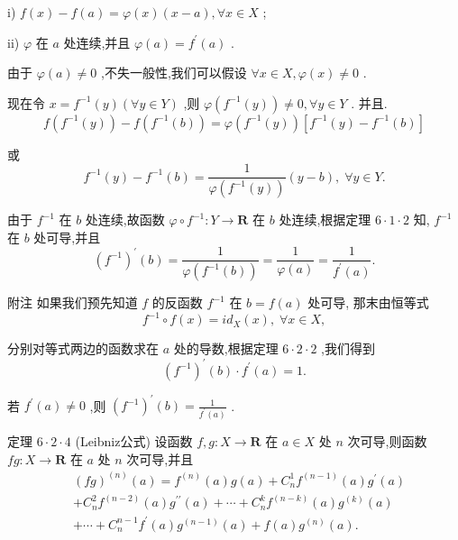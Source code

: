 i) $f\left( x\right)  - f\left( a\right)  = \varphi \left( x\right) \left( {x - a}\right) ,\forall x \in  X$ ;

ii) $\varphi$ 在 $a$ 处连续,并且 $\varphi \left( a\right)  = {f}^{\prime }\left( a\right)$ .

由于 $\varphi \left( a\right)  \neq  0$ ,不失一般性,我们可以假设 $\forall x \in  X,\varphi \left( x\right)  \neq  0$ .

现在令 $x = {f}^{-1}\left( y\right) \left( {\forall y \in  Y}\right)$ ,则 $\varphi \left( {{f}^{-1}\left( y\right) }\right)  \neq  0,\forall y \in  Y$ . 并且.
$$f\left( {{f}^{-1}\left( y\right) }\right)  - f\left( {{f}^{-1}\left( b\right) }\right)  = \varphi \left( {{f}^{-1}\left( y\right) }\right) \left\lbrack  {{f}^{-1}\left( y\right)  - {f}^{-1}\left( b\right) }\right\rbrack$$

或
$${f}^{-1}\left( y\right)  - {f}^{-1}\left( b\right)  = \frac{1}{\varphi \left( {{f}^{-1}\left( y\right) }\right) }\left( {y - b}\right) ,\;\forall y \in  Y.$$

由于 ${f}^{-1}$ 在 $b$ 处连续,故函数 $\varphi  \circ  {f}^{-1} : Y \rightarrow  \mathbf{R}$ 在 $b$ 处连续,根据定理 $6 \cdot  1 \cdot  2$ 知, ${f}^{-1}$ 在 $b$ 处可导,并且
$${\left( {f}^{-1}\right) }^{\prime }\left( b\right)  = \frac{1}{\varphi \left( {{f}^{-1}\left( b\right) }\right) } = \frac{1}{\varphi \left( a\right) } = \frac{1}{{f}^{\prime }\left( a\right) }.$$

附注 如果我们预先知道 $f$ 的反函数 ${f}^{-1}$ 在 $b = f\left( a\right)$ 处可导, 那末由恒等式
$${f}^{-1} \circ  f\left( x\right)  = i{d}_{X}\left( x\right) ,\;\forall x \in  X,$$

分别对等式两边的函数求在 $a$ 处的导数,根据定理 $6 \cdot  2 \cdot  2$ ,我们得到
$${\left( {f}^{-1}\right) }^{\prime }\left( b\right)  \cdot  {f}^{\prime }\left( a\right)  = 1.$$

若 ${f}^{\prime }\left( a\right)  \neq  0$ ,则 ${\left( {f}^{-1}\right) }^{\prime }\left( b\right)  = \frac{1}{{f}^{\prime }\left( a\right) }$ .

定理 $6 \cdot  2 \cdot  4$ (Leibniz公式) 设函数 $f,g : X \rightarrow  \mathbf{R}$ 在 $a \in  X$ 处 $n$ 次可导,则函数 ${fg} : X \rightarrow  \mathbf{R}$ 在 $a$ 处 $n$ 次可导,并且
\begin{align*}
	&{\left( fg\right) }^{\left( n\right) }\left( a\right)  = {f}^{\left( n\right) }\left( a\right) g\left( a\right)  + {C}_{n}^{1}{f}^{\left( n - 1\right) }\left( a\right) {g}^{\prime }\left( a\right)\\
	&+ {C}_{n}^{2}{f}^{\left( n - 2\right) }\left( a\right) {g}^{\prime \prime }\left( a\right)  + \cdots  + {C}_{n}^{k}{f}^{\left( n - k\right) }\left( a\right) {g}^{\left( k\right) }\left( a\right)\\
	&+ \cdots  + {C}_{n}^{n - 1}{f}^{\prime }\left( a\right) {g}^{\left( n - 1\right) }\left( a\right)  + f\left( a\right) {g}^{\left( n\right) }\left( a\right) .
\end{align*}

